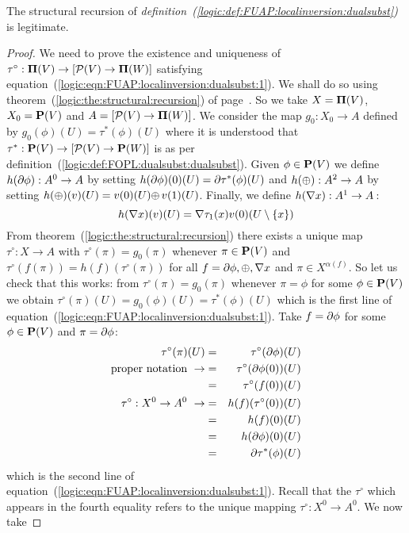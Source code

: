 \begin{prop}
The structural recursion of {\em
definition~(\ref{logic:def:FUAP:localinversion:dualsubst})} is
legitimate.
\end{prop}
\begin{proof}
We need to prove the existence and uniqueness of
$\tau^{\circ}:\mbox{${\bf\Pi}(V)$}\to[{\cal P}(V)\to{\bf\Pi}(W)]$ satisfying
equation~(\ref{logic:eqn:FUAP:localinversion:dualsubst:1}). We shall
do so using theorem~(\ref{logic:the:structural:recursion}) of
page~\pageref{logic:the:structural:recursion}. So we take $X=\mbox{${\bf\Pi}(V)$}$,
$X_{0}=\mbox{${\bf P}(V)$}$ and $A=[{\cal P}(V)\to{\bf\Pi}(W)]$. We consider the map
$g_{0}:X_{0}\to A$ defined by $g_{0}(\phi)(U)=\tau^{*}(\phi)(U)$
where it is understood that $\tau^{*}:\mbox{${\bf P}(V)$}\to[{\cal P}(V)\to{\bf
P}(W)]$ is as per
definition~(\ref{logic:def:FOPL:dualsubst:dualsubst}). Given
$\phi\in\mbox{${\bf P}(V)$}$ we define $h(\mbox{$\partial$}\phi):A^{0}\to A$ by setting
$h(\mbox{$\partial$}\phi)(0)(U)=\mbox{$\partial$}\tau^{*}(\phi)(U)$ and $h(\mbox{$\oplus$}):A^{2}\to A$
by setting $h(\mbox{$\oplus$})(v)(U)=v(0)(U)\mbox{$\oplus$}\,v(1)(U)$. Finally, we define
$h(\mbox{$\nabla$} x):A^{1}\to A$\,:
    \[
    h(\mbox{$\nabla$} x)(v)(U)=\mbox{$\nabla$}\tau_{1}(x)v(0)(U\setminus\{x\})
    \]
From theorem~(\ref{logic:the:structural:recursion}) there exists a
unique map $\tau^{\circ}:X\to A$ with $\tau^{\circ}(\pi)=g_{0}(\pi)$
whenever $\pi\in\mbox{${\bf P}(V)$}$ and
$\tau^{\circ}(f(\pi))=h(f)(\tau^{\circ}(\pi))$ for all
$f=\mbox{$\partial$}\phi,\mbox{$\oplus$},\mbox{$\nabla$} x$ and $\pi\in X^{\alpha(f)}$. So let us check
that this works: from $\tau^{\circ}(\pi)=g_{0}(\pi)$ whenever
$\pi=\phi$ for some $\phi\in\mbox{${\bf P}(V)$}$ we obtain
$\tau^{\circ}(\pi)(U)=g_{0}(\phi)(U)=\tau^{*}(\phi)(U)$ which is the
first line of
equation~(\ref{logic:eqn:FUAP:localinversion:dualsubst:1}). Take
$f=\mbox{$\partial$}\phi$ for some $\phi\in\mbox{${\bf P}(V)$}$ and $\pi=\mbox{$\partial$}\phi$:
    \begin{eqnarray*}
    \tau^{\circ}(\pi)(U)
    &=&\tau^{\circ}(\mbox{$\partial$}\phi)(U)\\
    \mbox{proper notation}\ \rightarrow
    &=&\tau^{\circ}(\mbox{$\partial$}\phi(0))(U)\\
    &=&\tau^{\circ}(f(0))(U)\\
    \tau^{\circ}:X^{0}\to A^{0}\ \rightarrow
    &=&h(f)(\tau^{\circ}(0))(U)\\
    &=&h(f)(0)(U)\\
    &=&h(\mbox{$\partial$}\phi)(0)(U)\\
    &=&\mbox{$\partial$}\tau^{*}(\phi)(U)
    \end{eqnarray*}
which is the second line of
equation~(\ref{logic:eqn:FUAP:localinversion:dualsubst:1}). Recall
that the $\tau^{\circ}$ which appears in the fourth equality refers
to the unique mapping $\tau^{\circ}:X^{0}\to A^{0}$. We now take

\end{proof}
